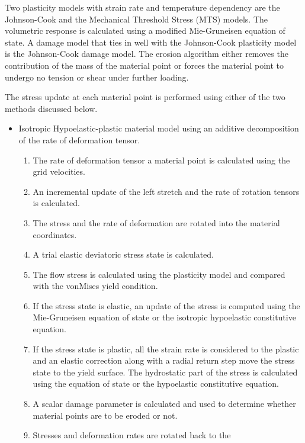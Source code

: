 Two plasticity models with strain rate and temperature dependency 
are the Johnson-Cook and the Mechanical Threshold Stress (MTS) 
models.  The volumetric response is calculated using a modified
Mie-Gruneisen equation of state.  A damage model that ties in well 
with the Johnson-Cook plasticity model is the Johnson-Cook damage 
model.  The erosion algorithm either removes the contribution
of the mass of the material point or forces the material point
to undergo no tension or shear under further loading.

The stress update at each material point is performed using either
of the two methods discussed below.
\begin{itemize}
   \item Isotropic Hypoelastic-plastic material model using an 
         additive decomposition of the rate of deformation tensor.
     \begin{enumerate}
        \item The rate of deformation tensor a material point
              is calculated using the grid velocities.
        \item An incremental update of the left stretch and the
              rate of rotation tensors is calculated.
        \item The stress and the rate of deformation are rotated
              into the material coordinates.
        \item A trial elastic deviatoric stress state is calculated.
        \item The flow stress is calculated using the plasticity
              model and compared with the vonMises yield condition.
        \item If the stress state is elastic, an update of the 
              stress is computed using the Mie-Gruneisen equation
              of state or the isotropic hypoelastic constitutive
              equation.
        \item If the stress state is plastic, all the strain rate 
              is considered to the plastic and an elastic correction
              along with a radial return step move the stress state
              to the yield surface.  The hydrostatic part of the 
              stress is calculated using the equation of state or
              the hypoelastic constitutive equation.
        \item A scalar damage parameter is calculated and used
              to determine whether material points are to be eroded
              or not.
        \item Stresses and deformation rates are rotated back to the

\end{enumerate}
\end{itemize}
